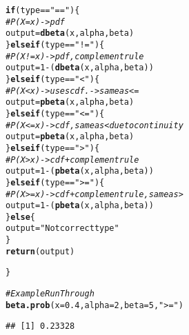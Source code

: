\documentclass{article}\usepackage[]{graphicx}\usepackage[]{xcolor}
\makeatletter
\newcommand{\hlnum}[1]{\textcolor[rgb]{0.686,0.059,0.569}{#1}}%
\newcommand{\hlsng}[1]{\textcolor[rgb]{0.192,0.494,0.8}{#1}}%
\newcommand{\hlcom}[1]{\textcolor[rgb]{0.678,0.584,0.686}{\textit{#1}}}%
\newcommand{\hlopt}[1]{\textcolor[rgb]{0,0,0}{#1}}%
\newcommand{\hldef}[1]{\textcolor[rgb]{0.345,0.345,0.345}{#1}}%
\newcommand{\hlkwa}[1]{\textcolor[rgb]{0.161,0.373,0.58}{\textbf{#1}}}%
\newcommand{\hlkwb}[1]{\textcolor[rgb]{0.69,0.353,0.396}{#1}}%
\newcommand{\hlkwc}[1]{\textcolor[rgb]{0.333,0.667,0.333}{#1}}%
\newcommand{\hlkwd}[1]{\textcolor[rgb]{0.737,0.353,0.396}{\textbf{#1}}}%
\newenvironment{kframe}{%
 \def\at@end@of@kframe{}%
 \ifinner\ifhmode%
  \def\at@end@of@kframe{\end{minipage}}%
  \begin{minipage}{\columnwidth}%
 \fi\fi%
 \def\FrameCommand##1{\hskip\@totalleftmargin \hskip-\fboxsep
 \colorbox{shadecolor}{##1}\hskip-\fboxsep
     \hskip-\linewidth \hskip-\@totalleftmargin \hskip\columnwidth}%
 \MakeFramed {\advance\hsize-\width
   \@totalleftmargin\z@ \linewidth\hsize
   \@setminipage}}%
 {\par\unskip\endMakeFramed%
 \at@end@of@kframe}
\newenvironment{knitrout}{}{} %
\makeatother
\begin{document}
\begin{enumerate}
\begin{knitrout}
\begin{kframe}
\begin{alltt}
  \hlkwa{if} \hldef{(type} \hlopt{==} \hlsng{"=="}\hldef{)\{}
    \hlcom{# P(X = x) -> pdf}
    \hldef{output} \hlkwb{=} \hlkwd{dbeta}\hldef{(x, alpha, beta)}
  \hldef{\}}\hlkwa{else if} \hldef{(type} \hlopt{==} \hlsng{"!="}\hldef{)\{}
    \hlcom{# P(X != x) -> pdf, complement rule}
    \hldef{output} \hlkwb{=} \hlnum{1} \hlopt{-} \hldef{(}\hlkwd{dbeta}\hldef{(x, alpha, beta))}
  \hldef{\}}\hlkwa{else if} \hldef{(type} \hlopt{==} \hlsng{"<"}\hldef{)\{}
    \hlcom{# P(X < x) -> uses cdf.      -> same as <=}
    \hldef{output} \hlkwb{=} \hlkwd{pbeta}\hldef{(x, alpha, beta)}
  \hldef{\}}\hlkwa{else if} \hldef{(type} \hlopt{==} \hlsng{"<="}\hldef{)\{}
    \hlcom{# P(X <= x) -> cdf , same as < due to continuity}
    \hldef{output} \hlkwb{=} \hlkwd{pbeta}\hldef{(x, alpha, beta)}
  \hldef{\}}\hlkwa{else if} \hldef{(type} \hlopt{==} \hlsng{">"}\hldef{)\{}
    \hlcom{# P(X > x) -> cdf + complement rule}
    \hldef{output} \hlkwb{=} \hlnum{1} \hlopt{-} \hldef{(}\hlkwd{pbeta}\hldef{(x, alpha, beta))}
  \hldef{\}}\hlkwa{else if} \hldef{(type} \hlopt{==} \hlsng{">="}\hldef{)\{}
    \hlcom{# P(X >= x) -> cdf + complement rule, same as >}
    \hldef{output} \hlkwb{=} \hlnum{1} \hlopt{-} \hldef{(}\hlkwd{pbeta}\hldef{(x, alpha, beta))}
  \hldef{\}} \hlkwa{else} \hldef{\{}
    \hldef{output} \hlkwb{=} \hlsng{"Not correct type"}
  \hldef{\}}
  \hlkwd{return}\hldef{(output)}

\hldef{\}}

\hlcom{# Example Run Through}
\hlkwd{beta.prob}\hldef{(}\hlkwc{x} \hldef{=} \hlnum{0.4}\hldef{,} \hlkwc{alpha} \hldef{=} \hlnum{2}\hldef{,} \hlkwc{beta} \hldef{=} \hlnum{5}\hldef{,} \hlsng{">="}\hldef{)}
\end{alltt}
\begin{verbatim}
## [1] 0.23328
\end{verbatim}
\end{kframe}
\end{knitrout}
\end{enumerate}

\end{document}
